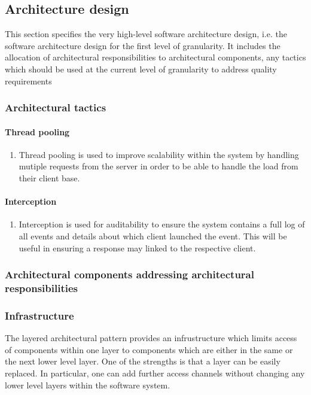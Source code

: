\documentclass[a4paper,12pt]{report}
\begin{document}
\newpage

\subsection {Architecture design}
This section specifies the very high-level software architecture design, i.e. the software architecture
design for the first level of granularity. It includes the allocation of architectural responsibilities to
architectural components, any tactics which should be used at the current level of granularity to
address quality requirements

\subsubsection {Architectural tactics}
\paragraph{Thread pooling}
\begin{enumerate}
	\item Thread pooling is used to improve scalability within the system by handling mutiple requests from the server in order to be able to handle the load from their client base.
\end{enumerate}
\paragraph{Interception}
\begin{enumerate}
	\item Interception is used for auditability to ensure the system contains a full log of all events and details about which client launched the event. This will be useful in ensuring a response may linked to the respective client.
\end{enumerate}
\subsubsection {Architectural components addressing architectural responsibilities}

\subsubsection {Infrastructure}
The layered architectural pattern provides an infrustructure which limits access of components within one layer to components which are either in the same or the next lower level layer. One of the strengths is that a layer can be easily replaced. In particular, one can add further access channels without changing any lower level layers within the software system.
\end{document}
